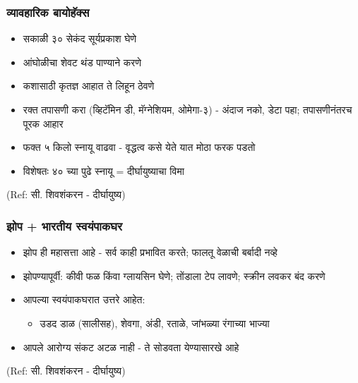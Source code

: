 \begin{frame}[fragile]\frametitle{व्यावहारिक बायोहॅक्स}

	\begin{itemize}
	\item सकाळी ३० सेकंद सूर्यप्रकाश घेणे
	\item आंघोळीचा शेवट थंड पाण्याने करणे
	\item कशासाठी कृतज्ञ आहात ते लिहून ठेवणे
	\item रक्त तपासणी करा (व्हिटॅमिन डी, मॅग्नेशियम, ओमेगा-३) - अंदाज नको, डेटा पहा; तपासणीनंतरच पूरक आहार
	\item फक्त ५ किलो स्नायू वाढवा - वृद्धत्व कसे येते यात मोठा फरक पडतो
	\item विशेषतः ४० च्या पुढे स्नायू = दीर्घायुष्याचा विमा
	\end{itemize}

{\tiny (Ref: सी. शिवशंकरन - दीर्घायुष्य)}

\end{frame}

\begin{frame}[fragile]\frametitle{झोप + भारतीय स्वयंपाकघर}

	\begin{itemize}
	\item झोप ही महासत्ता आहे - सर्व काही प्रभावित करते; फालतू वेळाची बर्बादी नव्हे
	\item झोपण्यापूर्वी: कीवी फळ किंवा ग्लायसिन घेणे; तोंडाला टेप लावणे; स्क्रीन लवकर बंद करणे
	\item आपल्या स्वयंपाकघरात उत्तरे आहेत:
		\begin{itemize}
		\item उडद डाळ (सालीसह), शेवगा, अंडी, रताळे, जांभळ्या रंगाच्या भाज्या
		\end{itemize}
	\item आपले आरोग्य संकट अटळ नाही - ते सोडवता येण्यासारखे आहे
	\end{itemize}

{\tiny (Ref: सी. शिवशंकरन - दीर्घायुष्य)}

\end{frame}
